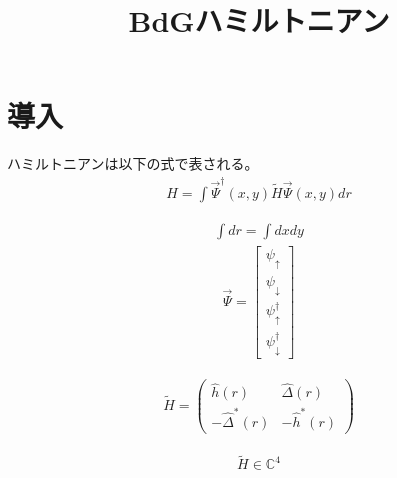 \documentclass{jarticle}
\begin{document}
\title{BdGハミルトニアン}
\maketitle

\tableofcontents
\newpage
\section{導入}

ハミルトニアンは以下の式で表される。
\begin{align}
  H=\int\vec{\Psi}^\dagger(x,y)\tilde{H}\vec{\Psi}(x,y)dr
\end{align}

\begin{align}
\int{dr}=\int{dxdy}
\end{align}
\begin{align}
\vec{\Psi}=\begin{bmatrix}
\psi_{\uparrow} \\ 
\psi_{\downarrow} \\ 
\psi_{\uparrow}^\dagger \\ 
\psi_{\downarrow}^\dagger
\end{bmatrix} 
\end{align}

\begin{align}
\tilde{H}=
\begin{pmatrix}
	\hat{h}(r) & \hat{\Delta}(r) \\ 
	-\hat{\Delta}^{*}(r) & -\hat{h}^{*}(r)
\end{pmatrix} 
\end{align}

\begin{align}
\tilde{H}\in\mathbb{C}^4
\end{align}
\end{document}
